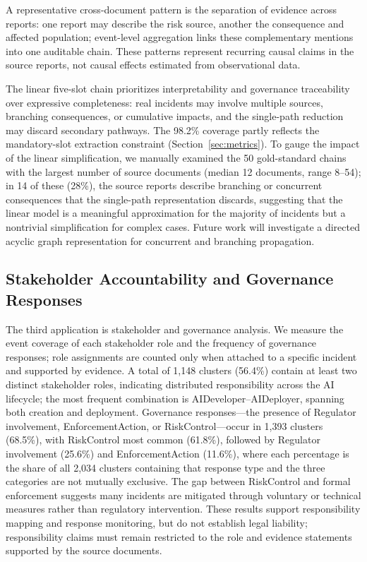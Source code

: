 \documentclass[a4paper,fleqn]{cas-dc}
\begin{document}
A representative cross-document pattern is the separation of evidence
across reports: one report may describe the risk source, another the
consequence and affected population; event-level aggregation links
these complementary mentions into one auditable chain.
These patterns represent recurring causal claims in the source reports,
not causal effects estimated from observational data.

The linear five-slot chain prioritizes interpretability and governance
traceability over expressive completeness: real incidents may involve
multiple sources, branching consequences, or cumulative impacts, and
the single-path reduction may discard secondary pathways.
The 98.2\% coverage partly reflects the mandatory-slot extraction
constraint (Section~\ref{sec:metrics}).
To gauge the impact of the linear simplification, we manually
examined the 50 gold-standard chains with the largest number of
source documents (median 12 documents, range 8--54); in 14 of these
(28\%), the source reports describe branching or concurrent
consequences that the single-path representation discards, suggesting
that the linear model is a meaningful approximation for the majority
of incidents but a nontrivial simplification for complex cases.
Future work will investigate a directed acyclic graph representation
for concurrent and branching propagation.

\subsection{Stakeholder Accountability and Governance Responses}

The third application is stakeholder and governance analysis. We
measure the event coverage of each stakeholder role and the frequency
of governance responses; role assignments are counted only when
attached to a specific incident and supported by evidence.
A total of 1{,}148 clusters (56.4\%) contain at least two distinct
stakeholder roles, indicating distributed responsibility across the AI
lifecycle; the most frequent combination is AIDeveloper--AIDeployer,
spanning both creation and deployment.
Governance responses---the presence of Regulator involvement,
EnforcementAction, or RiskControl---occur in 1{,}393 clusters (68.5\%),
with RiskControl most common (61.8\%), followed by Regulator
involvement (25.6\%) and EnforcementAction (11.6\%), where each
percentage is the share of all 2{,}034 clusters containing that
response type and the three categories are not mutually exclusive.
The gap between RiskControl and formal enforcement suggests many
incidents are mitigated through voluntary or technical measures rather
than regulatory intervention.
These results support responsibility mapping and response monitoring,
but do not establish legal liability; responsibility claims must remain
restricted to the role and evidence statements supported by the source
documents.
\end{document}
